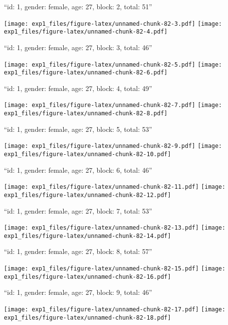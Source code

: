 \documentclass[11pt,,]{article}
\begin{document}
\newpage
[1] 

``id: 1, gender: female, age: 27, block: 2, total: 51''

\texttt{[image: exp1\_files/figure-latex/unnamed-chunk-82-3.pdf]}
\texttt{[image: exp1\_files/figure-latex/unnamed-chunk-82-4.pdf]}

\newpage
[1] 

``id: 1, gender: female, age: 27, block: 3, total: 46''

\texttt{[image: exp1\_files/figure-latex/unnamed-chunk-82-5.pdf]}
\texttt{[image: exp1\_files/figure-latex/unnamed-chunk-82-6.pdf]}

\newpage
[1] 

``id: 1, gender: female, age: 27, block: 4, total: 49''

\texttt{[image: exp1\_files/figure-latex/unnamed-chunk-82-7.pdf]}
\texttt{[image: exp1\_files/figure-latex/unnamed-chunk-82-8.pdf]}

\newpage
[1] 

``id: 1, gender: female, age: 27, block: 5, total: 53''

\texttt{[image: exp1\_files/figure-latex/unnamed-chunk-82-9.pdf]}
\texttt{[image: exp1\_files/figure-latex/unnamed-chunk-82-10.pdf]}

\newpage
[1] 

``id: 1, gender: female, age: 27, block: 6, total: 46''

\texttt{[image: exp1\_files/figure-latex/unnamed-chunk-82-11.pdf]}
\texttt{[image: exp1\_files/figure-latex/unnamed-chunk-82-12.pdf]}

\newpage
[1] 

``id: 1, gender: female, age: 27, block: 7, total: 53''

\texttt{[image: exp1\_files/figure-latex/unnamed-chunk-82-13.pdf]}
\texttt{[image: exp1\_files/figure-latex/unnamed-chunk-82-14.pdf]}

\newpage
[1] 

``id: 1, gender: female, age: 27, block: 8, total: 57''

\texttt{[image: exp1\_files/figure-latex/unnamed-chunk-82-15.pdf]}
\texttt{[image: exp1\_files/figure-latex/unnamed-chunk-82-16.pdf]}

\newpage
[1] 

``id: 1, gender: female, age: 27, block: 9, total: 46''

\texttt{[image: exp1\_files/figure-latex/unnamed-chunk-82-17.pdf]}
\texttt{[image: exp1\_files/figure-latex/unnamed-chunk-82-18.pdf]}

\newpage
[1] 
\end{document}
